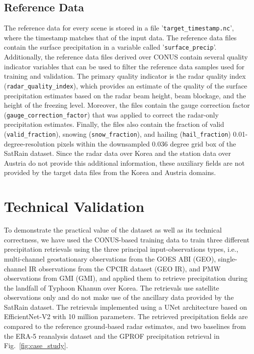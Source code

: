 \documentclass[11pt]{article}
\begin{document}
\subsection{Reference Data}

The reference data for every scene is stored in a file
'\texttt{target\_\textlangle timestamp\textrangle.nc}', where the timestamp
matches that of the input data. The reference data files contain the surface
precipitation in a variable called '\texttt{surface\_precip}'. Additionally, the
reference data files derived over CONUS contain several quality indicator
variables that can be used to filter the reference data samples used for
training and validation. The primary quality indicator is the radar quality
index (\texttt{radar\_quality\_index}), which provides an estimate of the
quality of the surface precipitation estimates based on the radar beam height,
beam blockage, and the height of the freezing level. Moreover, the files contain
the gauge correction factor (\texttt{gauge\_correction\_factor}) that was
applied to correct the radar-only precipitation estimates. Finally, the files
also contain the fraction of valid (\texttt{valid\_fraction}), snowing
(\texttt{snow\_fraction}), and hailing (\texttt{hail\_fraction})
0.01-degree-resolution pixels within the downsampled 0.036 degree grid box of
the SatRain dataset. Since the radar data over Korea and the station data over
Austria do not provide this additional information, these auxiliary fields are
not provided by the target data files from the Korea and Austria domains.


\section{Technical Validation}

To demonstrate the practical value of the dataset as well as its technical
correctness, we have used the CONUS-based training data to train three different
precipitation retrievals using the three principal input-observations types,
i.e., multi-channel geostationary observations from the GOES ABI (GEO),
single-channel IR observations from the CPCIR dataset (GEO IR), and PMW
observations from GMI (GMI), and applied them to retrieve precipitation during
the landfall of Typhoon Khanun over Korea. The retrievals use satellite
observations only and do not make use of the ancillary data provided by the
SatRain dataset. The retrievals implemented using a UNet architecture based on
EfficientNet-V2 with 10 million parameters. The retrieved precipitation fields
are compared to the reference ground-based radar estimates, and two baselines
from the ERA-5 reanalysis dataset and the GPROF precipitation retrieval in Fig.~\ref{fig:case_study}.
\end{document}
